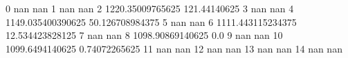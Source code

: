 0 nan nan
1 nan nan
2 1220.35009765625 121.44140625
3 nan nan
4 1149.035400390625 50.126708984375
5 nan nan
6 1111.443115234375 12.534423828125
7 nan nan
8 1098.90869140625 0.0
9 nan nan
10 1099.6494140625 0.74072265625
11 nan nan
12 nan nan
13 nan nan
14 nan nan
